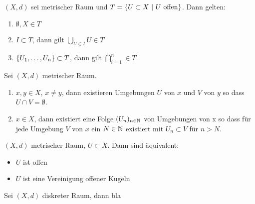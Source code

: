 \begin{stz}
    $(X,d)$ sei metrischer Raum und $T = \mdef[U\subset X]{U\ \mathrm{offen}}$.
    Dann gelten:
    \begin{enumerate}
        \item $\emptyset, X \in T$
        \item $I \subset T$, dann gilt $\bigcup_{U\in I} U \in T$
        \item $\mdef{U_1, \ldots, U_n} \subset T$, dann gilt
              $\bigcap_{i=1}^n \in T$
    \end{enumerate}
\end{stz}

\begin{stz}
    Sei $(X, d)$ metrischer Raum.
    \begin{enumerate}
        \item $x,y \in X$, $x \ne y$, dann existieren Umgebungen $U$ von $x$ und $V$
              von $y$ so dass $U \cap V = \emptyset$.
        \item $x \in X$, dann existiert eine Folge $(U_n)_{n\in \mathbb{N}}$ von Umgebungen
            von x so dass für jede Umgebung $V$ von $x$ ein $N\in\mathbb{N}$ existiert mit
            $U_n \subset V$ für $n > N$.
    \end{enumerate}
\end{stz}

\begin{stz}
    $(X, d)$ metrischer Raum, $U \subset X$. Dann sind äquivalent:
    \begin{itemize}
        \item $U$ ist offen
        \item $U$ ist eine Vereinigung offener Kugeln
    \end{itemize}
\begin{bem}
    Sei $(X, d)$ diskreter Raum, dann bla
\end{bem}
\end{stz}

